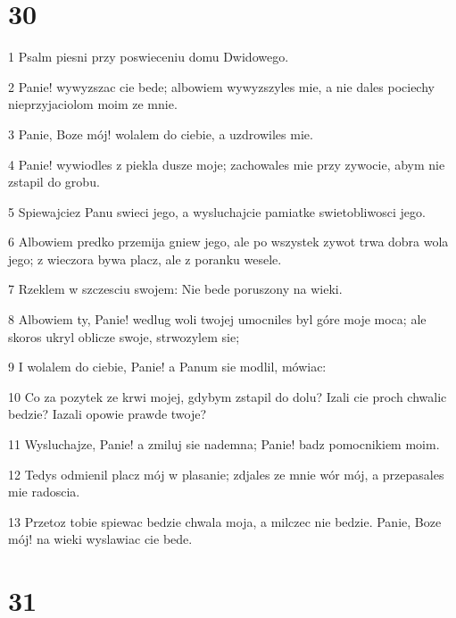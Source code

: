 \chapter{30}

\par 1 Psalm piesni przy poswieceniu domu Dwidowego.
\par 2 Panie! wywyzszac cie bede; albowiem wywyzszyles mie, a nie dales pociechy nieprzyjaciolom moim ze mnie.
\par 3 Panie, Boze mój! wolalem do ciebie, a uzdrowiles mie.
\par 4 Panie! wywiodles z piekla dusze moje; zachowales mie przy zywocie, abym nie zstapil do grobu.
\par 5 Spiewajciez Panu swieci jego, a wysluchajcie pamiatke swietobliwosci jego.
\par 6 Albowiem predko przemija gniew jego, ale po wszystek zywot trwa dobra wola jego; z wieczora bywa placz, ale z poranku wesele.
\par 7 Rzeklem w szczesciu swojem: Nie bede poruszony na wieki.
\par 8 Albowiem ty, Panie! wedlug woli twojej umocniles byl góre moje moca; ale skoros ukryl oblicze swoje, strwozylem sie;
\par 9 I wolalem do ciebie, Panie! a Panum sie modlil, mówiac:
\par 10 Co za pozytek ze krwi mojej, gdybym zstapil do dolu? Izali cie proch chwalic bedzie? Iazali opowie prawde twoje?
\par 11 Wysluchajze, Panie! a zmiluj sie nademna; Panie! badz pomocnikiem moim.
\par 12 Tedys odmienil placz mój w plasanie; zdjales ze mnie wór mój, a przepasales mie radoscia.
\par 13 Przetoz tobie spiewac bedzie chwala moja, a milczec nie bedzie. Panie, Boze mój! na wieki wyslawiac cie bede.

\chapter{31}

